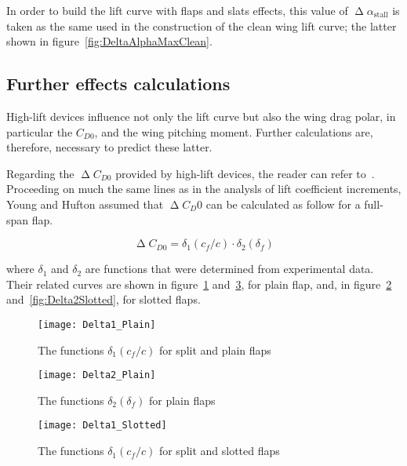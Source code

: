 In order to build the lift curve with flaps and slats effects, this value of $\upDelta\alpha_{\text{stall}}$ is taken as the same used in the construction of the clean wing lift curve; the latter shown in figure~\ref{fig:DeltaAlphaMaxClean}.
 
\subsection{Further effects calculations}\label{subpar:DCD0}
High-lift devices influence not only the lift curve but also the wing drag polar, in particular the $C_{D0}$, and the wing pitching moment. Further calculations are, therefore, necessary to predict these latter.

\bigskip
\noindent
Regarding the $\upDelta C_{D0}$ provided by high-lift devices, the reader can refer to~\cite{Young:Flaps}. Proceeding on much the same lines as in the analysls of lift coefficient increments, Young and Hufton assumed that  $\upDelta C_D0$ can be calculated as follow for a full-span flap.

\begin{equation}
\upDelta C_{D0}=\delta_1\left(c_f/c\right)\cdot\delta_2\left(\delta_f\right)
\label{eqn:DeltaCD0FullSpan}
\end{equation}

where $\delta_1$ and $\delta_2$ are functions that were determined from experimental data. Their related curves are shown in figure~\ref{fig:Delta1Plain} and~\ref{fig:Delta2Plain}, for plain flap, and, in figure~\ref{fig:Delta1Slotted} and~\ref{fig:Delta2Slotted}, for slotted flaps.

\begin{figure}[!b]
  \centering
  \texttt{[image: Delta1\_Plain]}
  \caption{The functions $\delta_1\left(c_f/c\right)$ for split and plain flaps}
  \label{fig:Delta1Plain}
\end{figure}

\begin{figure}[H]
  \centering
  \texttt{[image: Delta2\_Plain]}
  \caption{The functions $\delta_2\left(\delta_f\right)$ for plain flaps}
  \label{fig:Delta1Slotted}
\end{figure}

\begin{figure}[H]
  \centering
  \texttt{[image: Delta1\_Slotted]}
  \caption{The functions $\delta_1\left(c_f/c\right)$ for split and slotted flaps}
  \label{fig:Delta2Plain}
\end{figure}

